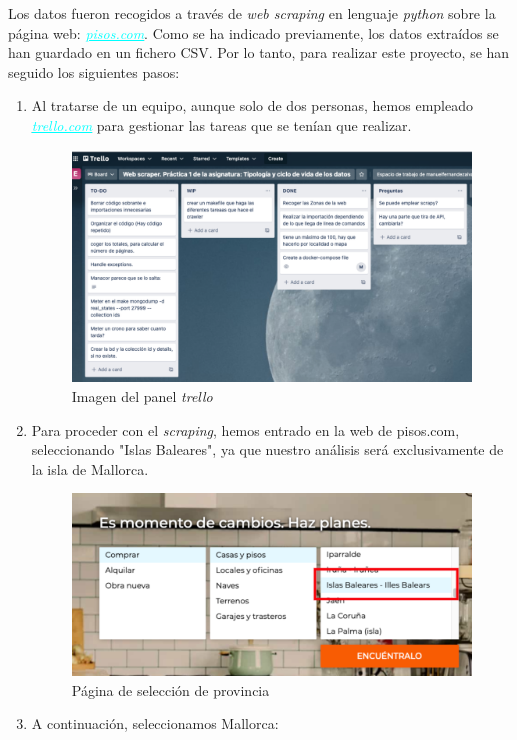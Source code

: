 \documentclass[a4paper, 12pt]{article}
\begin{document}
Los datos fueron recogidos a través de {\itshape web scraping} en lenguaje {\itshape python} sobre la página web: \href{https://www.pisos.com} {\textcolor{cyan}{\underline{{\itshape pisos.com}}}}. Como se ha indicado previamente, los datos extraídos se han guardado en un fichero CSV. Por lo tanto, para realizar este proyecto, se han seguido los siguientes pasos:
\begin{enumerate}
	
	\item Al tratarse de un equipo, aunque solo de dos personas, hemos empleado \href{https://www.trello.com} {\textcolor{cyan}{\underline{{\itshape trello.com}}}} para gestionar las tareas que se tenían que realizar.
	
	\begin{figure}[H]
		\centering
		\includegraphics[width=0.7\linewidth]{img/screenshot008}
		\caption{Imagen del panel {\itshape trello}}
		\label{fig:screenshot008}
	\end{figure}
	\item Para proceder con el {\itshape scraping}, hemos entrado en la web de pisos.com, seleccionando "Islas Baleares", ya que nuestro análisis será exclusivamente de la isla de Mallorca.
	
	\begin{figure}[H]
		\centering
		\includegraphics[width=0.7\linewidth]{img/screenshot009}
		\caption{Página de selección de provincia}
		\label{fig:screenshot009}
	\end{figure}
	
	
	\item A continuación, seleccionamos Mallorca:
	

\end{enumerate}
\end{document}

